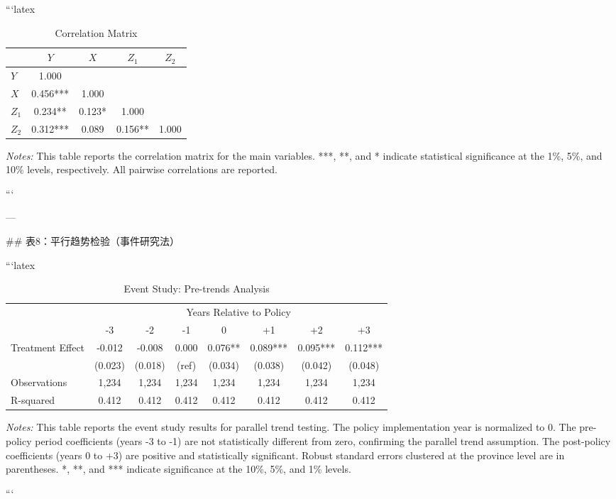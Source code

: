 ```latex
\begin{table}[htbp]
\centering
\caption{Correlation Matrix}
\label{tab:corr}
\scriptsize
\begin{tabular}{lcccc}
\toprule
 & $Y$ & $X$ & $Z_1$ & $Z_2$ \\
\midrule
$Y$ & 1.000 & & & \\
$X$ & 0.456*** & 1.000 & & \\
$Z_1$ & 0.234** & 0.123* & 1.000 & \\
$Z_2$ & 0.312*** & 0.089 & 0.156** & 1.000 \\
\bottomrule
\end{tabular}
\begin{minipage}{\linewidth}
\smallskip
\textit{Notes:} This table reports the correlation matrix for the main variables. ***, **, and * indicate statistical significance at the 1\%, 5\%, and 10\% levels, respectively. All pairwise correlations are reported.
\end{minipage}
\end{table}
```

---

## 表8：平行趋势检验（事件研究法）

```latex
\begin{table}[htbp]
\centering
\caption{Event Study: Pre-trends Analysis}
\label{tab:pretrend}
\scriptsize
\begin{tabular}{lccccccc}
\toprule
 & \multicolumn{7}{c}{Years Relative to Policy} \\
\cmidrule(lr){2-8}
 & -3 & -2 & -1 & 0 & +1 & +2 & +3 \\
\midrule
Treatment Effect & -0.012 & -0.008 & 0.000 & 0.076** & 0.089*** & 0.095*** & 0.112*** \\
 & (0.023) & (0.018) & (ref) & (0.034) & (0.038) & (0.042) & (0.048) \\
\midrule
Observations & 1,234 & 1,234 & 1,234 & 1,234 & 1,234 & 1,234 & 1,234 \\
R-squared & 0.412 & 0.412 & 0.412 & 0.412 & 0.412 & 0.412 & 0.412 \\
\bottomrule
\end{tabular}
\begin{minipage}{\linewidth}
\smallskip
\textit{Notes:} This table reports the event study results for parallel trend testing. The policy implementation year is normalized to 0. The pre-policy period coefficients (years -3 to -1) are not statistically different from zero, confirming the parallel trend assumption. The post-policy coefficients (years 0 to +3) are positive and statistically significant. Robust standard errors clustered at the province level are in parentheses. *, **, and *** indicate significance at the 10\%, 5\%, and 1\% levels.
\end{minipage}
\end{table}
```

